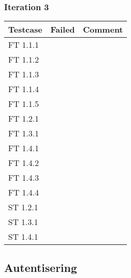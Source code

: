 \documentclass[a4paper]{article}
\begin{document}
\subsubsection{Iteration 3}
\begin{tabular}{| l | l | p{11cm} |}
\hline
Testcase &  Failed & Comment\\
\hline
FT 1.1.1 & & \\
\hline
FT 1.1.2 & & \\
\hline
FT 1.1.3 & & \\
\hline
FT 1.1.4 & & \\
\hline
FT 1.1.5 & & \\
\hline
FT 1.2.1 & & \\
\hline
FT 1.3.1 & & \\
\hline
FT 1.4.1 & & \\
\hline
FT 1.4.2 & & \\
\hline
FT 1.4.3 & & \\
\hline
FT 1.4.4 & & \\
\hline
ST 1.2.1 & & \\
\hline
ST 1.3.1 & & \\
\hline
ST 1.4.1 & & \\
\hline
\end{tabular}







\subsection{Autentisering}
\end{document}

